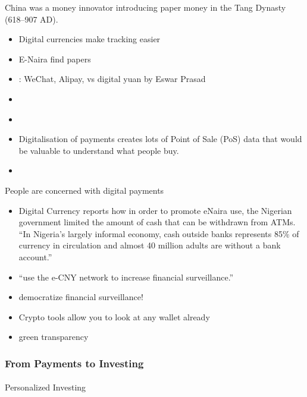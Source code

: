 \documentclass[
  letterpaper,
  DIV=11,
  numbers=noendperiod]{scrartcl}
\makeatletter
\let\oldparagraph\paragraph
\renewcommand{\paragraph}{
    \@ifstar
      \xxxParagraphStar
      \xxxParagraphNoStar
  }
\newcommand{\xxxParagraphStar}[1]{\oldparagraph*{#1}\mbox{}}
\newcommand{\xxxParagraphNoStar}[1]{\oldparagraph{#1}\mbox{}}
\providecommand{\tightlist}{%
  \setlength{\itemsep}{0pt}\setlength{\parskip}{0pt}}\usepackage{longtable,booktabs,array}
\makeatother
\begin{document}
\citet{FirstPaperMoney} China was a money innovator introducing paper
money in the Tang Dynasty (618--907 AD).

\begin{itemize}
\item
  \citet{CentralBankDigital2023} Digital currencies make tracking easier
\item
  E-Naira find papers
\item
  \citet{yahoofinanceChallengesFacingChina2022}: WeChat, Alipay, vs
  digital yuan by Eswar Prasad
\item
  \citet{marisaadangilCriptomoedasVaoAcabar2022}
\item
  \citet{caiojobimBitcoinFalhouCriptomoedas2022}
\item
  Digitalisation of payments creates lots of Point of Sale (PoS) data
  that would be valuable to understand what people buy.
\item
  \citet{EuropeanFintechsWatch2022}
\end{itemize}

People are concerned with digital payments

\begin{itemize}
\tightlist
\item
  Digital Currency \citet{emeleonuNigeriaCapsATM2022} reports how in
  order to promote eNaira use, the Nigerian government limited the
  amount of cash that can be withdrawn from ATMs. ``In Nigeria's largely
  informal economy, cash outside banks represents 85\% of currency in
  circulation and almost 40 million adults are without a bank account.''
\item
  \citet{jeffbensonChinaReleasesDigital2022} ``use the e-CNY network to
  increase financial surveillance.''
\item
  democratize financial surveillance!
\item
  Crypto tools allow you to look at any wallet already
\item
  green transparency
\end{itemize}

\subsubsection{From Payments to
Investing}\label{from-payments-to-investing}

\paragraph{Personalized Investing}\label{personalized-investing}
\end{document}
